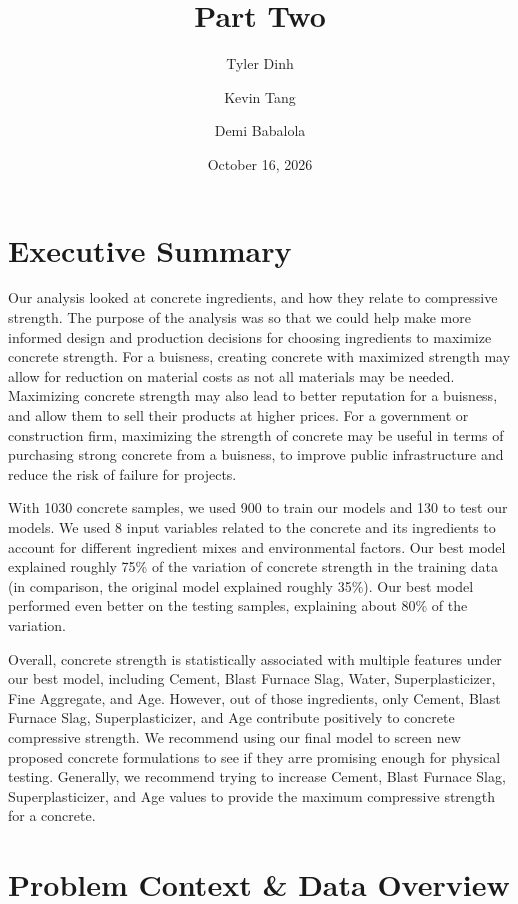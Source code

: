 \documentclass[12pt,letterpaper]{article}
\title{\huge Part Two}
\author[1]{Tyler Dinh}
\author[1]{Kevin Tang}
\author[1]{Demi Babalola}
\affil[1]{Washington University in St. Louis}
\date{October 16, 2026}
\begin{document}
\maketitle

\newpage

\section{Executive Summary}

Our analysis looked at concrete ingredients, and how they relate to compressive strength. The purpose of the analysis was so that we could help make more informed design and production decisions for choosing ingredients to maximize concrete strength. For a buisness, creating concrete with maximized strength may allow for reduction on material costs as not all materials may be needed. Maximizing concrete strength may also lead to better reputation for a buisness, and allow them to sell their products at higher prices. For a government or construction firm, maximizing the strength of concrete may be useful in terms of purchasing strong concrete from a buisness, to improve public infrastructure and reduce the risk of failure for projects.

With 1030 concrete samples, we used 900 to train our models and 130 to test our models. We used 8 input variables related to the concrete and its ingredients to account for different ingredient mixes and environmental factors. Our best model explained roughly 75\% of the variation of concrete strength in the training data (in comparison, the original model explained roughly 35\%). Our best model performed even better on the testing samples, explaining about 80\% of the variation.

Overall, concrete strength is statistically associated with multiple features under our best model, including Cement, Blast Furnace Slag, Water, Superplasticizer, Fine Aggregate, and Age. However, out of those ingredients, only Cement, Blast Furnace Slag, Superplasticizer, and Age contribute positively to concrete compressive strength. We recommend using our final model to screen new proposed concrete formulations to see if they arre promising enough for physical testing. Generally, we recommend trying to increase Cement, Blast Furnace Slag, Superplasticizer, and Age values to provide the maximum compressive strength for a concrete.

\newpage

\section{Problem Context \& Data Overview}
\end{document}
